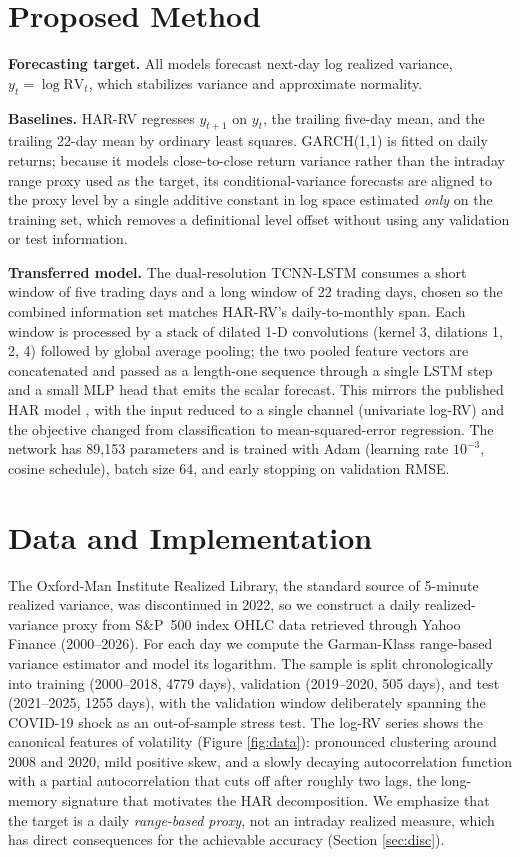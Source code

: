 \documentclass[11pt]{article}
\begin{document}
\section{Proposed Method}
\textbf{Forecasting target.} All models forecast next-day log realized variance, $y_t=\log \mathrm{RV}_t$,
which stabilizes variance and approximate normality.

\textbf{Baselines.} HAR-RV regresses $y_{t+1}$ on $y_t$, the trailing five-day mean, and the trailing
22-day mean by ordinary least squares. GARCH(1,1) is fitted on daily returns; because it models
close-to-close return variance rather than the intraday range proxy used as the target, its
conditional-variance forecasts are aligned to the proxy level by a single additive constant in log
space estimated \emph{only} on the training set, which removes a definitional level offset without
using any validation or test information.

\textbf{Transferred model.} The dual-resolution TCNN-LSTM consumes a short window of five trading days
and a long window of 22 trading days, chosen so the combined information set matches HAR-RV's
daily-to-monthly span. Each window is processed by a stack of dilated 1-D convolutions (kernel 3,
dilations 1, 2, 4) followed by global average pooling; the two pooled feature vectors are concatenated
and passed as a length-one sequence through a single LSTM step and a small MLP head that emits the
scalar forecast. This mirrors the published HAR model \citep{warnants2026}, with the input reduced to a
single channel (univariate log-RV) and the objective changed from classification to mean-squared-error
regression. The network has 89{,}153 parameters and is trained with Adam (learning rate $10^{-3}$,
cosine schedule), batch size 64, and early stopping on validation RMSE.

\section{Data and Implementation}
The Oxford-Man Institute Realized Library, the standard source of 5-minute realized variance, was
discontinued in 2022, so we construct a daily realized-variance proxy from S\&P~500 index OHLC data
retrieved through Yahoo Finance (2000--2026). For each day we compute the Garman-Klass range-based
variance estimator \citep{garmanklass1980} and model its logarithm. The sample is split chronologically
into training (2000--2018, 4779 days), validation (2019--2020, 505 days), and test (2021--2025, 1255
days), with the validation window deliberately spanning the COVID-19 shock as an out-of-sample stress
test. The log-RV series shows the canonical features of volatility (Figure \ref{fig:data}): pronounced
clustering around 2008 and 2020, mild positive skew, and a slowly decaying autocorrelation function with
a partial autocorrelation that cuts off after roughly two lags, the long-memory signature that motivates
the HAR decomposition. We emphasize that the target is a daily \emph{range-based proxy}, not an intraday
realized measure, which has direct consequences for the achievable accuracy (Section \ref{sec:disc}).
\end{document}
